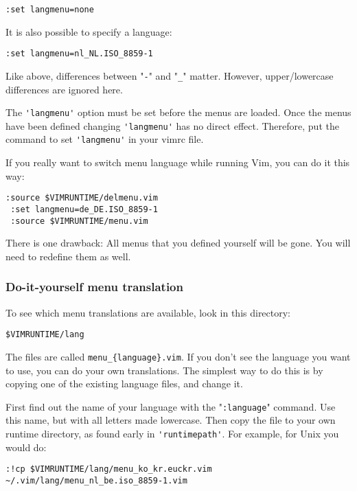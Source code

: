 \begin{Verbatim}[samepage=true]
 :set langmenu=none
\end{Verbatim}

It is also possible to specify a language:

\begin{Verbatim}[samepage=true]
 :set langmenu=nl_NL.ISO_8859-1
\end{Verbatim}

Like above, differences between "\verb!-!" and "\verb!_!" matter.
However, upper/lowercase differences are ignored here.

The \verb!'langmenu'! option must be set before the menus are loaded.
Once the menus have been defined changing \verb!'langmenu'! has no direct effect.
Therefore, put the command to set \verb!'langmenu'! in your vimrc file.

If you really want to switch menu language while running Vim, you can do it this way:

\begin{Verbatim}[samepage=true]
 :source $VIMRUNTIME/delmenu.vim
 :set langmenu=de_DE.ISO_8859-1
 :source $VIMRUNTIME/menu.vim
\end{Verbatim}

There is one drawback: All menus that you defined yourself will be gone.
You will need to redefine them as well.

\subsubsection{Do-it-yourself menu translation}
To see which menu translations are available, look in this directory:

\begin{Verbatim}[samepage=true]
    $VIMRUNTIME/lang 
\end{Verbatim}

The files are called \verb!menu_{language}.vim!.
If you don't see the language you want to use, you can do your own translations.
The simplest way to do this is by copying one of the existing language files, and change it.

First find out the name of your language with the "\verb!:language!" command.
Use this name, but with all letters made lowercase.
Then copy the file to your own runtime directory, as found early in \verb!'runtimepath'!.
For example, for Unix you would do:

\begin{Verbatim}[samepage=true]
 :!cp $VIMRUNTIME/lang/menu_ko_kr.euckr.vim ~/.vim/lang/menu_nl_be.iso_8859-1.vim
\end{Verbatim}

